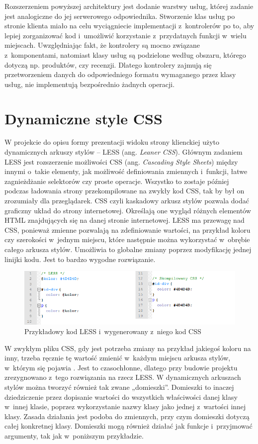 Rozszerzeniem powyższej architektury jest dodanie warstwy usług, której zadanie jest analogiczne do jej serwerowego odpowiednika. Stworzenie klas usług po stronie klienta miało na celu wyciągniecie implementacji z~kontrolerów po to, aby lepiej zorganizować kod i~umożliwić korzystanie z~przydatnych funkcji w~wielu miejscach. Uwzględniając fakt, że kontrolery są mocno związane z~komponentami, natomiast klasy usług są podzielone według obszaru, którego dotyczą np. produktów, czy recenzji. Dlatego kontrolery zajmują się przetworzeniem danych do odpowiedniego formatu wymaganego przez klasy usług, nie implementują bezpośrednio żadnych operacji.



\section{Dynamiczne style CSS}
W projekcie do opisu formy prezentacji widoku strony klienckiej użyto dynamicznych arkuszy stylów – LESS (ang. \textit{Leaner CSS}). Głównym zadaniem LESS jest rozszerzenie możliwości CSS (ang. \textit{Cascading Style Sheets}) między innymi o~takie elementy, jak możliwość definiowania zmiennych i~funkcji, łatwe zagnieżdżanie selektorów czy proste operacje. Wszystko to zostaje później podczas ładowania strony przekompilowane na zwykły kod CSS, tak by był on zrozumiały dla przeglądarek. CSS czyli kaskadowy arkusz stylów pozwala dodać graficzny układ do strony internetowej. Określają one wygląd różnych elementów HTML znajdujących się na danej stronie internetowej. 
LESS ma przewagę nad CSS, ponieważ zmienne pozwalają na zdefiniowanie wartości, na przykład koloru czy szerokości w~jednym miejscu, które następnie można wykorzystać w~obrębie całego arkusza stylów. Umożliwia to globalne zmiany poprzez modyfikację jednej linijki kodu. Jest to bardzo wygodne rozwiązanie. 

\begin{figure}[H]
	\centering
	\includegraphics[width=1.00\textwidth]{images/less1.png}
	\caption{Przykładowy kod LESS i~wygenerowany z~niego kod CSS}
\end{figure}

W zwykłym pliku CSS, gdy jest potrzeba zmiany na przykład jakiegoś koloru na inny, trzeba ręcznie tę wartość zmienić w~każdym miejscu arkusza stylów, w~którym się pojawia \cite{cssBook}. Jest to czasochłonne, dlatego przy budowie projektu zrezygnowano z~tego rozwiązania na rzecz LESS. 
W dynamicznych arkuszach stylów można tworzyć również tak zwane „domieszki”. Domieszki to inaczej dziedziczenie przez dopisanie wartości do wszystkich właściwości danej klasy w~innej klasie, poprzez wykorzystanie nazwy klasy jako jednej z~wartości innej klasy. Zasada działania jest podoba do zmiennych, przy czym domieszki dotyczą całej konkretnej klasy. Domieszki mogą również działać jak funkcje i~przyjmować argumenty, tak jak w~poniższym przykładzie.


